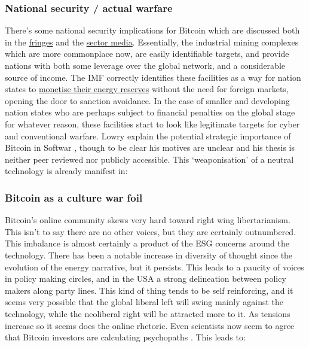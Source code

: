 \subsubsection{National security / actual warfare}
There's some national security implications for Bitcoin which are discussed both in the \href{https://twitter.com/JasonPLowery/status/1512775981693648897?}{fringes} and the \href{https://www.coindesk.com/layer2/2022/04/04/why-bitcoin-mining-is-a-matter-of-national-security/}{sector media}. Essentially, the industrial mining complexes which are more commonplace now, are easily identifiable targets, and provide nations with both some leverage over the global network, and a considerable source of income. The IMF correctly identifies these facilities as a way for nation states to \href{https://www.imf.org/en/Publications/GFSR/Issues/2022/04/19/global-financial-stability-report-april-2022}{monetise their energy reserves} without the need for foreign markets, opening the door to sanction avoidance. In the case of smaller and developing nation states who are perhaps subject to financial penalties on the global stage for whatever reason, these facilities start to look like legitimate targets for cyber and conventional warfare. Lowry explain the potential strategic importance of Bitcoin in Softwar \cite{Lowery2023}, though to be clear his motives are unclear and his thesis is neither peer reviewed nor publicly accessible. This `weaponisation' of a neutral technology is already manifest in:
\subsubsection{Bitcoin as a culture war foil}
Bitcoin's online community skews very hard toward right wing libertarianism. This isn't to say there are no other voices, but they are certainly outnumbered. This imbalance is almost certainly a product of the ESG concerns around the technology. There has been a notable increase in diversity of thought since the evolution of the energy narrative, but it persists. This leads to a paucity of voices in policy making circles, and in the USA a strong delineation between policy makers along party lines. This kind of thing tends to be self reinforcing, and it seems very possible that the global liberal left will swing mainly against the technology, while the neoliberal right will be attracted more to it. As tensions increase so it seems does the online rhetoric. Even scientists now seem to agree that Bitcoin investors are calculating psychopaths \cite{martin2022dark}. This leads to:
